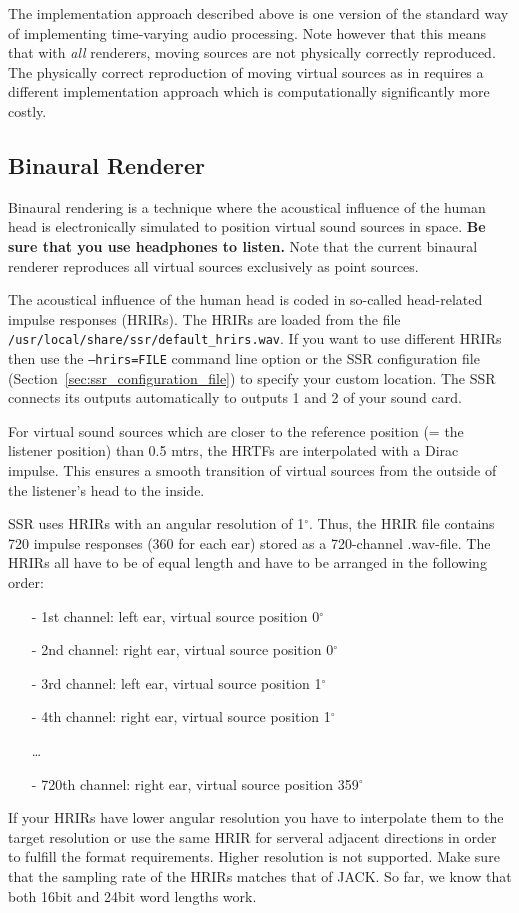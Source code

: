 The implementation approach described above is one version of the standard way
of implementing time-varying audio processing. Note however that this means
that with \emph{all} renderers, moving sources are not physically correctly
reproduced. The physically correct reproduction of moving virtual sources as in
\cite{Ahrens08:MOVING_AES,Ahrens08:SUPERSONIC_AES} requires a different
implementation approach which is computationally significantly more costly.

\subsection{Binaural Renderer}
\label{sec:binaural_renderer}

Binaural rendering is a technique where the acoustical influence of the human
head is electronically simulated to position virtual sound sources in space.
{\bf Be sure that you use headphones to listen.} Note that the current binaural
renderer reproduces all virtual sources exclusively as point sources.

The acoustical influence of the human head is coded in so-called head-related
impulse responses (HRIRs). The HRIRs are loaded from the file
\texttt{/usr/local/share/ssr/default\_hrirs.wav}. If you want to use different
HRIRs then use the \texttt{--hrirs=FILE} command line option or the SSR
configuration file (Section~\ref{sec:ssr_configuration_file}) to specify your
custom location. The SSR connects its outputs automatically to outputs 1 and 2
of your sound card.

For virtual sound sources which are closer to the reference position (= the
listener position) than 0.5 mtrs, the HRTFs are interpolated with a Dirac impulse. This
ensures a smooth transition of virtual sources from the outside of the
listener's head to the inside.

SSR uses HRIRs with an angular resolution of 1$^\circ$. Thus, the HRIR file
contains 720 impulse responses (360 for each ear) stored as a 720-channel
.wav-file. The HRIRs all have to be of equal length and have to be arranged in
the following order:
%
\begin{itemize}
\item[-] 1st channel: left ear, virtual source position 0$^\circ$
\item[-] 2nd channel: right ear, virtual source position 0$^\circ$
\item[-] 3rd channel: left ear, virtual source position 1$^\circ$
\item[-] 4th channel: right ear, virtual source position 1$^\circ$
\item[] \dots
\item[-] 720th channel: right ear, virtual source position 359$^\circ$
\end{itemize}
%
If your HRIRs have lower angular resolution you have to interpolate them to the
target resolution or use the same HRIR for serveral adjacent directions in
order to fulfill the format requirements. Higher resolution is not supported.
Make sure that the sampling rate of the HRIRs matches that of JACK. So far, we
know that both 16bit and 24bit word lengths work.

